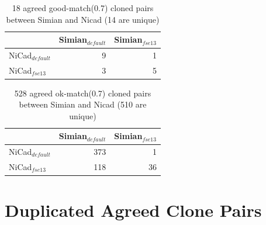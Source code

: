 \documentclass{IEEEtran}
\begin{document}
\begin{table}[h]
	\centering
	\caption{18 agreed good-match(0.7) cloned pairs between Simian and Nicad (14 are unique)}
	\label{t_agreed_good_clone_pairs}
	\begin{tabular}{l|r|r}
		\hline
		& Simian$_{\mathrm{\textit{default}}}$ & Simian$_{\mathrm{\textit{fse13}}}$ \\ %
		\hline
		NiCad$_{\mathrm{\textit{default}}}$ & 9 & 1 \\ %
		NiCad$_{\mathrm{\textit{fse13}}}$   & 3 & 5 \\ %
		\hline
	\end{tabular}
\end{table}

\begin{table}[h]
	\centering
	\caption{528 agreed ok-match(0.7) cloned pairs between Simian and Nicad (510 are unique)}
	\label{t_agreed_ok_clone_pairs}
	\begin{tabular}{l|r|r}
		\hline
		& Simian$_{\mathrm{\textit{default}}}$ & Simian$_{\mathrm{\textit{fse13}}}$ \\ %
		\hline
		NiCad$_{\mathrm{\textit{default}}}$ & 373 & 1 \\%
		NiCad$_{\mathrm{\textit{fse13}}}$   & 118 & 36 \\ %
		\hline
	\end{tabular}
\end{table}

\section*{Duplicated Agreed Clone Pairs}
\end{document}
